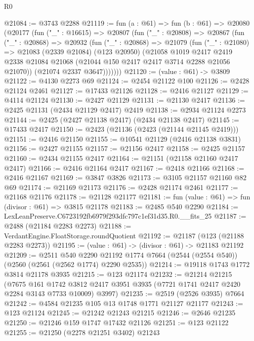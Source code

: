 \begin{lexlean}{R0}
\begin{coremodule}
@21084 := @3743 @2288
@21119 := fun (a : @61) =>
  fun (b : @61) =>
  @20080
    (@20177
      (fun ("_" : @16615) =>
      @20807
        (fun ("_" : @20808) =>
        @20867
          (fun ("_" : @20868) =>
          @20932
            (fun ("_" : @20868) =>
            @21079
              (fun ("_" : @21080) =>
              @21083
                (@2339 @21084)
                (@123 @20950)
                (@21058
                  @1019
                  @2417
                  @2419
                  @2338
                  @21084
                  @21068
                  (@21044 @150 @2417 @2417 @3714 @2288 @21056 @21070))
                (@21074 @2337 @3647)))))))
@21120 := (value : @61) -> @3809
@21122 := @4130 @2273 @69
@21124 := @2454 @21122 @100
@21126 := @2428 @21124 @2461
@21127 := @17433 @21126
@21128 := @2416 @21127
@21129 := @4114 @21124
@21130 := @2427 @21129
@21131 := @21130 @2417
@21136 := @2425 @21131 (@2434 @21129 @2417) @2419
@21138 := @2934 @21124 @2273
@21144 := @2425 (@2427 @21138 @2417) (@2434 @21138 @2417)
@21145 := @17433 @2417
@21150 := @2423 (@21136 (@2423 (@21144 @21145 @2419)))
@21151 := @2416 @21150
@21155 := @10541 @21129 (@2416 @21138 @3831)
@21156 := @2427 @21155
@21157 := @21156 @2417
@21158 := @2425 @21157
@21160 := @2434 @21155 @2417
@21164 := @21151 (@21158 @21160 @2417 @2417)
@21166 := @2416 @21164 @2417
@21167 := @2418 @21166
@21168 := @2416 @21167
@21169 := @3847 @3826
@21173 := @3105 @21157 @21160 @82 @69
@21174 := @21169 @21173
@21176 := @2428 @21174 @2461
@21177 := @21168 @21176
@21178 := @21128 @21177
@21181 := fun (value : @61) => fun (divisor : @61) => @3815 @21178
@21183 := @2485 @540 @2290
@21184 := LexLeanPreserve.C6723192fb6979f293dfc797c1ef31d35.R0.__fits_25
@21187 := @2488 (@21184 @2283 @2273)
@21188 := VerdantEngine.FloatStorage.roundQuotient
@21192 := @21187 (@123 (@21188 @2283 @2273))
@21195 := (value : @61) -> (divisor : @61) -> @21183 @21192
@21209 := @2511
    @540
    @2290
    @21192
    @1774
    @7664
    (@2544 (@2554 @540))
    (@2560 (@2561 (@2562 @1774) @2290 @2535))
@21214 := @19118 @1743 @1772 @3814 @21178 @3935
@21215 := @123 @21174
@21232 := @21214
    @21215
    (@7675
      @161
      @1742
      @3812
      @2417
      @3951
      @3935
      (@7721 @1741 @2417 @2420 @2284 @3143 @7733 @10009)
      @3997)
@21235 := @2519 (@2526 @3935) @7664
@21242 := @4584 @21235 @105 @13 @1748 @1771 @21127 @21177
@21243 := @123 @21124
@21245 := @21242 @21243 @21215
@21246 := @2646 @21235
@21250 := @21246 @159 @1747 @17432 @21126
@21251 := @123 @21122
@21255 := @21250 (@2278 @21251 @3402) @21243

\end{coremodule}
\end{lexlean}
